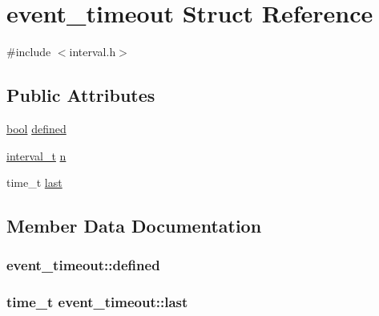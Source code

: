 \hypertarget{structevent__timeout}{}\section{event\+\_\+timeout Struct Reference}
\label{structevent__timeout}


{\ttfamily \#include $<$interval.\+h$>$}

\subsection*{Public Attributes}
\begin{DoxyCompactItemize}
\item 
\hyperlink{automatic_8c_abb452686968e48b67397da5f97445f5b}{bool} \hyperlink{structevent__timeout_ae8593ffdc52e7d0db227b02a70977465}{defined}
\item 
\hyperlink{common_8h_a3d8621f960ada51a5ad9ff181730481a}{interval\+\_\+t} \hyperlink{structevent__timeout_a65d28a125324b9550b025a3deacfc97a}{n}
\item 
time\+\_\+t \hyperlink{structevent__timeout_ae95e73029bdf24d4586b89ab294dd9f6}{last}
\end{DoxyCompactItemize}


\subsection{Member Data Documentation}
\hypertarget{structevent__timeout_ae8593ffdc52e7d0db227b02a70977465}{}
\subsubsection[{defined}]{ event\+\_\+timeout\+::defined}\label{structevent__timeout_ae8593ffdc52e7d0db227b02a70977465}
\hypertarget{structevent__timeout_ae95e73029bdf24d4586b89ab294dd9f6}{}
\subsubsection[{last}]{\setlength{\rightskip}{0pt plus 5cm}time\+\_\+t event\+\_\+timeout\+::last}\label{structevent__timeout_ae95e73029bdf24d4586b89ab294dd9f6}
\hypertarget{structevent__timeout_a65d28a125324b9550b025a3deacfc97a}{}
